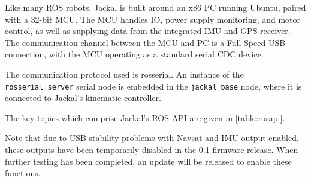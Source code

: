 \documentclass[]{clearpath-latex/clearpath-manual}
\begin{document}
Like many ROS robots, Jackal is built around an x86 PC running Ubuntu, paired with a
32-bit MCU. The MCU handles IO, power supply monitoring, and motor control, as well as
supplying data from the integrated IMU and GPS receiver. The communication channel
between the MCU and PC is a Full Speed USB connection, with the MCU operating as a
standard serial CDC device.

The communication protocol used is rosserial. An instance of the \lstinline{rosserial_server}
serial node is embedded in the \lstinline{jackal_base} node, where it is connected to
Jackal's kinematic controller.

The key topics which comprise Jackal's ROS API are given in \autoref{table:rosapi}.


\begin{warning}
Note that due to USB stability problems with Navsat and IMU output enabled, these outputs
have been temporarily disabled in the 0.1 firmware release. When further testing has been
completed, an update will be released to enable these functions.
\end{warning}
\end{document}
